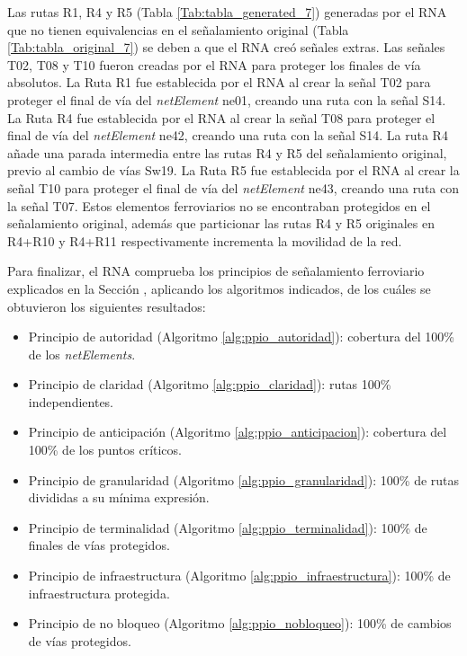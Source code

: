      Las rutas R1, R4 y R5 (Tabla \ref{Tab:tabla_generated_7}) generadas por el RNA que no tienen equivalencias en el señalamiento original (Tabla \ref{Tab:tabla_original_7}) se deben a que el RNA creó señales extras. Las señales T02, T08 y T10 fueron creadas por el RNA para proteger los finales de vía absolutos. La Ruta R1 fue establecida por el RNA al crear la señal T02 para proteger el final de vía del \textit{netElement} ne01, creando una ruta con la señal S14. La Ruta R4 fue establecida por el RNA al crear la señal T08 para proteger el final de vía del \textit{netElement} ne42, creando una ruta con la señal S14. La ruta R4 añade una parada intermedia entre las rutas R4 y R5 del señalamiento original, previo al cambio de vías Sw19. La Ruta R5 fue establecida por el RNA al crear la señal T10 para proteger el final de vía del \textit{netElement} ne43, creando una ruta con la señal T07. Estos elementos ferroviarios no se encontraban protegidos en el señalamiento original, además que particionar las rutas R4 y R5 originales en R4+R10 y R4+R11 respectivamente incrementa la movilidad de la red.
     
     Para finalizar, el RNA comprueba los principios de señalamiento ferroviario explicados en la Sección \label{sec:validar_principios}, aplicando los algoritmos indicados, de los cuáles se obtuvieron los siguientes resultados:
     
     \begin{itemize}
     	\item Principio de autoridad (Algoritmo \ref{alg:ppio_autoridad}): cobertura del 100\% de los \textit{netElements}.
     	\item Principio de claridad (Algoritmo \ref{alg:ppio_claridad}): rutas 100\% independientes.
     	\item Principio de anticipación (Algoritmo \ref{alg:ppio_anticipacion}): cobertura del 100\% de los puntos críticos.
     	\item Principio de granularidad (Algoritmo \ref{alg:ppio_granularidad}): 100\% de rutas divididas a su mínima expresión.
     	\item Principio de terminalidad (Algoritmo \ref{alg:ppio_terminalidad}): 100\% de finales de vías protegidos.
     	\item Principio de infraestructura (Algoritmo \ref{alg:ppio_infraestructura}): 100\% de infraestructura protegida.
     	\item Principio de no bloqueo (Algoritmo \ref{alg:ppio_nobloqueo}): 100\% de cambios de vías protegidos.
     \end{itemize}	